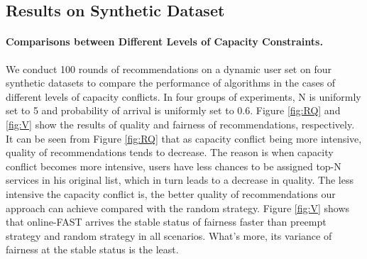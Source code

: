 \subsection{Results on Synthetic Dataset}
\paragraph{Comparisons between Different Levels of Capacity Constraints.} We conduct 100 rounds of recommendations on a dynamic user set on four synthetic datasets to compare the performance of algorithms in the cases of different levels of capacity conflicts. In four groups of experiments, N is uniformly set to 5 and probability of arrival is uniformly set to 0.6. Figure \ref{fig:RQ} and \ref{fig:V} show the results of quality and fairness of recommendations, respectively. It can be seen from Figure \ref{fig:RQ} that as capacity conflict being more intensive, quality of recommendations tends to decrease. The reason is when capacity conflict becomes more intensive, users have less chances to be assigned top-N services in his original list, which in turn leads to a decrease in quality. The less intensive the capacity conflict is, the better quality of recommendations our approach can achieve compared with the random strategy. Figure \ref{fig:V} shows that online-FAST arrives the stable status of fairness faster than preempt strategy and random strategy in all scenarios. What's more, its variance of fairness at the stable status is the least.
